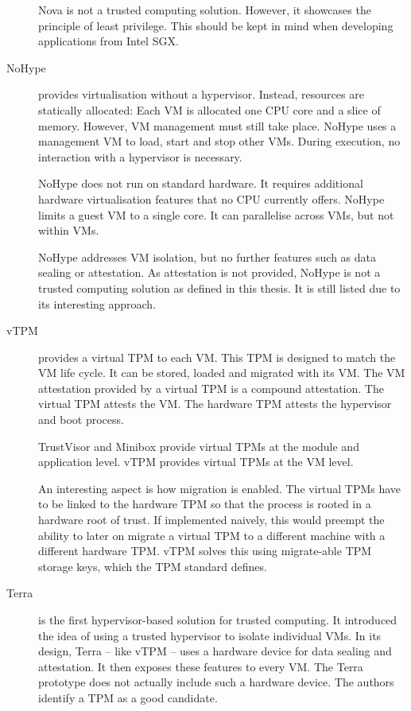 \begin{description}
Nova is not a trusted computing solution. However, it showcases the principle of least privilege. This should be kept in mind when developing applications from Intel SGX.\label{ID_1949063731}
\item[NoHype\cite{Keller2010}]\label{ID_399891803}
provides virtualisation without a hypervisor.\label{ID_1982528190}
Instead, resources are statically allocated: Each VM is allocated one CPU core and a slice of memory.\label{ID_1103417020}
However, VM management must still take place.\label{ID_460072436}
NoHype uses a management VM to load, start and stop other VMs.\label{ID_1653231210}
During execution, no interaction with a hypervisor is necessary.\label{ID_78679497}

NoHype does not run on standard hardware. It requires additional hardware virtualisation features that no CPU currently offers.\label{ID_1042436161}
NoHype limits a guest VM to a single core. It can parallelise across VMs, but not within VMs.\label{ID_1868828851}

NoHype addresses VM isolation, but no further features such as data sealing or attestation. As attestation is not provided, NoHype is not a trusted computing solution as defined in this thesis. It is still listed due to its interesting approach.\label{ID_1659320949}
\item[vTPM\cite{Perez2006}]\label{ID_253555451}
provides a virtual TPM to each VM.\label{ID_771624481}
This TPM is designed to match the VM life cycle. It can be stored, loaded and migrated with its VM.\label{ID_330974310}
The VM attestation provided by a virtual TPM is a compound attestation. The virtual TPM attests the VM. The hardware TPM attests the hypervisor and boot process.\label{ID_1083096548}

TrustVisor and Minibox provide virtual TPMs at the module and application level. vTPM provides virtual TPMs at the VM level.\label{ID_202468909}

An interesting aspect is how migration is enabled. The virtual TPMs have to be linked to the hardware TPM so that the process is rooted in a hardware root of trust.\label{ID_555144421}
If implemented naively, this would preempt the ability to later on migrate a virtual TPM to a different machine with a different hardware TPM.\label{ID_1205234476}
vTPM solves this using migrate-able TPM storage keys, which the TPM standard defines.\label{ID_964255737}
\item[Terra\cite{Garfinkel2003}]\label{ID_931924935}
is the first hypervisor-based solution for trusted computing.\label{ID_1552017657}
It introduced the idea of using a trusted hypervisor to isolate individual VMs.\label{ID_744934551}
In its design, Terra -- like vTPM -- uses a hardware device for data sealing and attestation.\label{ID_1233067999}
It then exposes these features to every VM.\label{ID_570557425}
The Terra prototype does not actually include such a hardware device. The authors identify a TPM as a good candidate.\label{ID_1769638002}
\end{description}\label{ID_1381661910}

